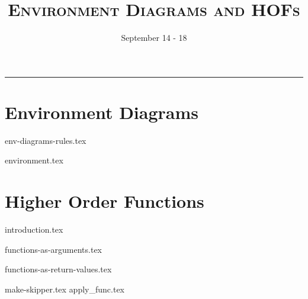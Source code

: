 \documentclass{exam}
\title{\textsc{Environment Diagrams and HOFs}}
\date{September 14 - 18}
\begin{document}
\maketitle
\rule{\textwidth}{0.15em}
\fontsize{12}{15}\selectfont



\vspace{-1em}
\section{Environment Diagrams}
{env-diagrams-rules.tex}
\newpage
\begin{questions}
{environment.tex}

\end{questions}

\newpage
\section{Higher Order Functions}
{introduction.tex}

\vspace{5mm}
\newline
{functions-as-arguments.tex}

\vspace{5mm}
\newline
{functions-as-return-values.tex}

\begin{questions}
{make-skipper.tex}
{apply_func.tex}
\end{questions}
\end{document}

